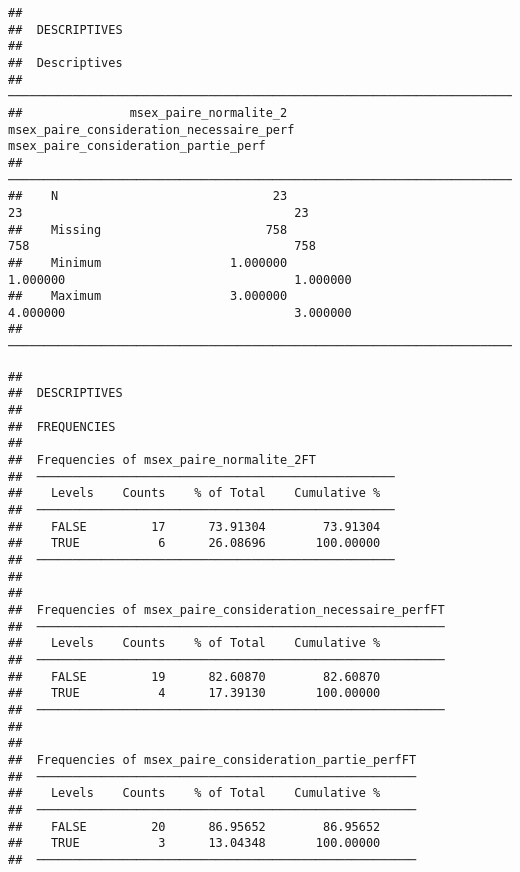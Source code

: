 \documentclass[
]{article}
\begin{document}
\begin{verbatim}
## 
##  DESCRIPTIVES
## 
##  Descriptives                                                                                                              
##  ───────────────────────────────────────────────────────────────────────────────────────────────────────────────────────── 
##               msex_paire_normalite_2    msex_paire_consideration_necessaire_perf    msex_paire_consideration_partie_perf   
##  ───────────────────────────────────────────────────────────────────────────────────────────────────────────────────────── 
##    N                              23                                          23                                      23   
##    Missing                       758                                         758                                     758   
##    Minimum                  1.000000                                    1.000000                                1.000000   
##    Maximum                  3.000000                                    4.000000                                3.000000   
##  ─────────────────────────────────────────────────────────────────────────────────────────────────────────────────────────
\end{verbatim}

\begin{verbatim}
## 
##  DESCRIPTIVES
## 
##  FREQUENCIES
## 
##  Frequencies of msex_paire_normalite_2FT            
##  ────────────────────────────────────────────────── 
##    Levels    Counts    % of Total    Cumulative %   
##  ────────────────────────────────────────────────── 
##    FALSE         17      73.91304        73.91304   
##    TRUE           6      26.08696       100.00000   
##  ────────────────────────────────────────────────── 
## 
## 
##  Frequencies of msex_paire_consideration_necessaire_perfFT 
##  ───────────────────────────────────────────────────────── 
##    Levels    Counts    % of Total    Cumulative %   
##  ───────────────────────────────────────────────────────── 
##    FALSE         19      82.60870        82.60870   
##    TRUE           4      17.39130       100.00000   
##  ───────────────────────────────────────────────────────── 
## 
## 
##  Frequencies of msex_paire_consideration_partie_perfFT 
##  ───────────────────────────────────────────────────── 
##    Levels    Counts    % of Total    Cumulative %   
##  ───────────────────────────────────────────────────── 
##    FALSE         20      86.95652        86.95652   
##    TRUE           3      13.04348       100.00000   
##  ─────────────────────────────────────────────────────
\end{verbatim}
\end{document}
